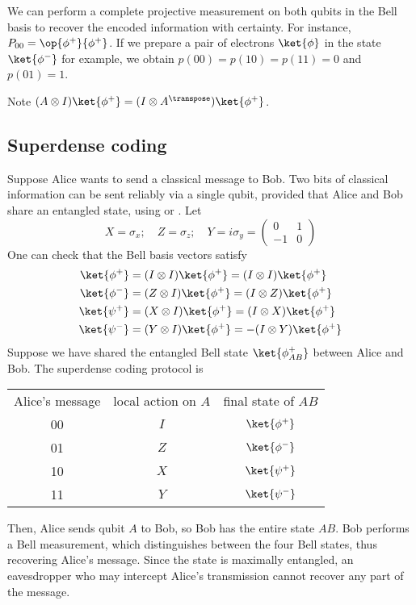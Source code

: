 We can perform a complete projective measurement on both qubits in the Bell basis to recover the encoded information with certainty.
For instance, $P_{00} = \op{\phi^+}{\phi^+}$.
If we prepare a pair of electrons $\ket{\phi}$ in the state $\ket{\phi^-}$ for example, we obtain $p(00) = p(10) = p(11) = 0$ and $p(01) = 1$.

Note $(A \otimes I) \ket{\phi^+} = (I \otimes A^\transpose) \ket{\phi^+}$.

\subsection{Superdense coding}
Suppose Alice wants to send a classical message to Bob.
Two bits of classical information can be sent reliably via a single qubit, provided that Alice and Bob share an entangled state, using  or .
Let
\[ X = \sigma_x;\quad Z = \sigma_z;\quad Y = i\sigma_y = \begin{pmatrix}
    0 & 1 \\
    -1 & 0
\end{pmatrix} \]
One can check that the Bell basis vectors satisfy
\begin{align*}
    \ket{\phi^+} &= (I \otimes I) \ket{\phi^+} = (I \otimes I) \ket{\phi^+}\\
    \ket{\phi^-} &= (Z \otimes I) \ket{\phi^+} = (I \otimes Z) \ket{\phi^+}\\
    \ket{\psi^+} &= (X \otimes I) \ket{\phi^+} = (I \otimes X) \ket{\phi^+}\\
    \ket{\psi^-} &= (Y \otimes I) \ket{\phi^+} = -(I \otimes Y) \ket{\phi^+}
\end{align*}
Suppose we have shared the entangled Bell state $\ket{\phi^+_{AB}}$ between Alice and Bob.
The superdense coding protocol is
\begin{center}
    \begin{tabular}{c c c}
        Alice's message & local action on $A$ & final state of $AB$ \\
        00 & $I$ & $\ket{\phi^+}$ \\
        01 & $Z$ & $\ket{\phi^-}$ \\
        10 & $X$ & $\ket{\psi^+}$ \\
        11 & $Y$ & $\ket{\psi^-}$
    \end{tabular}
\end{center}
Then, Alice sends qubit $A$ to Bob, so Bob has the entire state $AB$.
Bob performs a Bell measurement, which distinguishes between the four Bell states, thus recovering Alice's message.
Since the state is maximally entangled, an eavesdropper who may intercept Alice's transmission cannot recover any part of the message.

